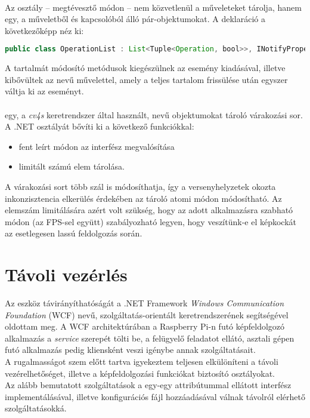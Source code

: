 \paragraph{}
Az osztály -- megtévesztő módon -- nem közvetlenül a műveleteket tárolja, hanem egy, a műveletből és  kapcsolóból álló pár-objektumokat. A deklaráció a következőképp néz ki:
\begin{scriptsize}
\begin{lstlisting}[language=java]
public class OperationList : List<Tuple<Operation, bool>>, INotifyPropertyChanged
\end{lstlisting}
\end{scriptsize}

A  tartalmát módosító metódusok kiegészülnek az esemény kiadásával, illetve kibővültek az  nevű művelettel, amely a teljes tartalom frissülése után egyszer váltja ki az eseményt.

\paragraph{} egy, a \emph{cv4s} keretrendszer által használt,  nevű objektumokat tároló várakozási sor. A .NET  osztályát bővíti ki a következő funkciókkal:
\begin{itemize}
\item fent leírt módon az  interfész megvalósítása
\item limitált számú elem tárolása.
\end{itemize}
A várakozási sort több szál is módosíthatja, így a versenyhelyzetek okozta inkonzisztencia elkerülés érdekében az tároló atomi módon módosítható. Az elemszám limitálására azért volt szükség, hogy az adott alkalmazásra szabható módon (az FPS-sel együtt) szabályozható legyen, hogy veszítünk-e el képkockát az esetlegesen lassú feldolgozás során.

\section{Távoli vezérlés}

Az eszköz távirányíthatóságát a .NET Framework \emph{Windows Communication Foundation} (WCF) nevű, szolgáltatás-orientált keretrendszerének segítségével oldottam meg. A WCF architektúrában a Raspberry Pi-n futó képfeldolgozó alkalmazás a \textit{service} szerepét tölti be, a felügyelő feladatot ellátó, asztali gépen futó alkalmazás pedig kliensként veszi igénybe annak szolgáltatásait.\\
A rugalmasságot szem előtt tartva igyekeztem teljesen elkülöníteni a távoli vezérelhetőséget, illetve a képfeldolgozási funkciókat biztosító osztályokat.\\
Az alább bemutatott szolgáltatások a egy-egy  attribútummal ellátott interfész implementálásával, illetve konfigurációs fájl hozzáadásával válnak távolról elérhető szolgáltatásokká.

